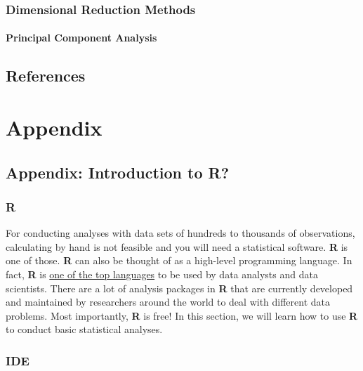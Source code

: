\documentclass[
  letterpaper,
  DIV=11,
  numbers=noendperiod]{scrreprt}
\begin{document}
\section{Dimensional Reduction
Methods}\label{dimensional-reduction-methods}

\subsection{Principal Component
Analysis}\label{principal-component-analysis}


\chapter*{References}\label{references}


\label{refs}

\part{Appendix}

\chapter{Appendix: Introduction to R?}\label{appendix-introduction-to-r}

\section{R}\label{r}

For conducting analyses with data sets of hundreds to thousands of
observations, calculating by hand is not feasible and you will need a
statistical software. \textbf{R} is one of those. \textbf{R} can also be
thought of as a high-level programming language. In fact, \textbf{R} is
\href{https://statisticstimes.com/tech/top-computer-languages.php}{one
of the top languages} to be used by data analysts and data scientists.
There are a lot of analysis packages in \textbf{R} that are currently
developed and maintained by researchers around the world to deal with
different data problems. Most importantly, \textbf{R} is free! In this
section, we will learn how to use \textbf{R} to conduct basic
statistical analyses.

\section{IDE}\label{ide}
\end{document}
